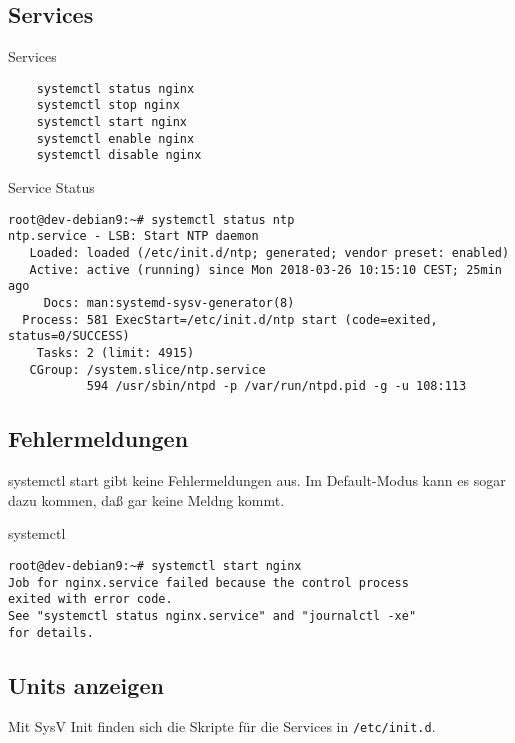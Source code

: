 \subsection{Services}

\begin{frame}[fragile]{Services}
 \begin{lstlisting}
    systemctl status nginx
    systemctl stop nginx
    systemctl start nginx
    systemctl enable nginx
    systemctl disable nginx
  \end{lstlisting}
\end{frame}

\begin{frame}[fragile]{Service Status}
	\begin{lstlisting}	
root@dev-debian9:~# systemctl status ntp
ntp.service - LSB: Start NTP daemon
   Loaded: loaded (/etc/init.d/ntp; generated; vendor preset: enabled)
   Active: active (running) since Mon 2018-03-26 10:15:10 CEST; 25min ago
     Docs: man:systemd-sysv-generator(8)
  Process: 581 ExecStart=/etc/init.d/ntp start (code=exited, status=0/SUCCESS)
    Tasks: 2 (limit: 4915)
   CGroup: /system.slice/ntp.service
           594 /usr/sbin/ntpd -p /var/run/ntpd.pid -g -u 108:113
	\end{lstlisting}
\end{frame}

\subsection{Fehlermeldungen}

systemctl start gibt keine Fehlermeldungen aus. Im Default-Modus kann es sogar dazu kommen, daß gar keine Meldng kommt.

\begin{frame}[fragile]{systemctl}
\begin{lstlisting}
root@dev-debian9:~# systemctl start nginx
Job for nginx.service failed because the control process
exited with error code.
See "systemctl status nginx.service" and "journalctl -xe" 
for details.
\end{lstlisting}
\end{frame}

\subsection{Units anzeigen}

Mit SysV Init finden sich die Skripte für die Services in \verb|/etc/init.d|.

